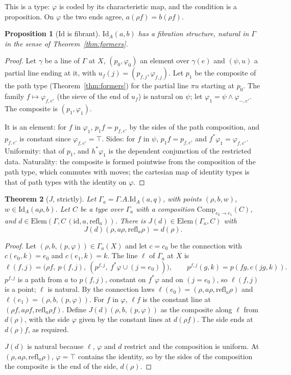 \documentclass[11pt]{article}
\newcommand{\Elem}{\mathrm{Elem}}
\newcommand{\Comp}{\mathrm{Comp}}
\newcommand{\Id}{\mathrm{Id}}
\newcommand{\id}{\mathrm{id}}
\theoremstyle{plain}
\newtheorem{theorem}{Theorem}[section]
\newtheorem{proposition}[theorem]{Proposition}
\theoremstyle{definition}
\theoremstyle{remark}
\begin{document}
This is a type: $\varphi$ is coded by its characteristic map, and the
condition is a proposition. On $\varphi$ the two ends agree, $a(\rho f)=
b(\rho f)$.

\begin{proposition}[$\Id$ is fibrant]\label{prop:id-fib}
$\Id_A(a,b)$ has a fibration structure, natural in $\Gamma$ in the sense
of Theorem~\ref{thm:formers}.
\end{proposition}

\begin{proof}
Let $\gamma$ be a line of $\Gamma$ at $X$, $(p_0,\varphi_0)$ an element
over $\gamma(e)$ and $(\psi,u)$ a partial line ending at it, with
$u_f(j)=(p_{f,j},\varphi_{f,j})$. Let $p_1$ be the composite of the path
type (Theorem~\ref{thm:formers}) for the partial line $\pi u$ starting
at $p_0$. The family $f\mapsto\varphi_{f,e'}$ (the sieve of the end of
$u_f$) is natural on $\psi$; let $\varphi_1=\psi\wedge\varphi_{-,e'}$. The
composite is $(p_1,\varphi_1)$.

It is an element: for $f$ in $\varphi_1$, $p_1f=p_{f,e'}$ by the sides of
the path composition, and $p_{f,e'}$ is constant since
$\varphi_{f,e'}=\top$. Sides: for $f$ in $\psi$, $p_1f=p_{f,e'}$ and
$f^*\varphi_1=\varphi_{f,e'}$. Uniformity: that of $p_1$, and
$h^*\varphi_1$ is the dependent conjunction of the restricted data.
Naturality: the composite is formed pointwise from the composition of the
path type, which commutes with moves; the cartesian map of identity
types is that of path types with the identity on $\varphi$.
\end{proof}

\begin{theorem}[$J$, strictly]\label{thm:swan-j}
Let $\Gamma_a=\Gamma.A.\Id_A(a,q)$, with points $(\rho,b,w)$,
$w\in\Id_A(a\rho,b)$. Let $C$ be a type over $\Gamma_a$ with a composition
$\Comp_{e_0\to e_1}(C)$, and $d\in\Elem(\Gamma,C\,(\id,a,\mathrm{refl}_a))$. There
is $J(d)\in\Elem(\Gamma_a,C)$ with
\[
J(d)(\rho,a\rho,\mathrm{refl}_a\rho)=d(\rho).
\]
\end{theorem}

\begin{proof}
Let $(\rho,b,(p,\varphi))\in\Gamma_a(X)$ and let $c=c_0$ be the connection
with $c(e_0,k)=e_0$ and $c(e_1,k)=k$. The line $\ell$ of $\Gamma_a$ at $X$ is
\[
\ell(f,j)=\bigl(\rho f,\ p(f,j),\ (p^{f,j},\ f^*\varphi\cup(j=e_0))\bigr),
\qquad p^{f,j}(g,k)=p(fg,c(jg,k)).
\]
$p^{f,j}$ is a path from $a$ to $p(f,j)$, constant on $f^*\varphi$ and on
$(j=e_0)$, so $\ell(f,j)$ is a point; $\ell$ is natural. By the connection
laws $\ell(e_0)=(\rho,a\rho,\mathrm{refl}_a\rho)$ and
$\ell(e_1)=(\rho,b,(p,\varphi))$. For $f$ in $\varphi$, $\ell f$ is the
constant line at $(\rho f,a\rho f,\mathrm{refl}_a\rho f)$. Define
$J(d)(\rho,b,(p,\varphi))$ as the composite along $\ell$ from $d(\rho)$,
with the side $\varphi$ given by the constant lines at $d(\rho f)$. The
side ends at $d(\rho)f$, as required.

$J(d)$ is natural because $\ell$, $\varphi$ and $d$ restrict and the
composition is uniform. At $(\rho,a\rho,\mathrm{refl}_a\rho)$, $\varphi=\top$
contains the identity, so by the sides of the composition the composite
is the end of the side, $d(\rho)$.
\end{proof}
\end{document}
